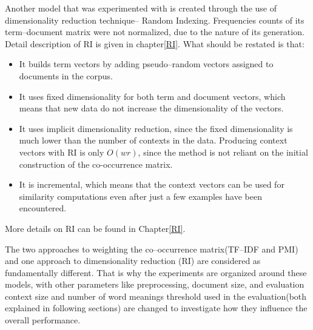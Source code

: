 Another model that was experimented with is created through the use of dimensionality reduction 
technique-- Random Indexing. Frequencies counts of its term--document matrix were not normalized, 
due to the nature of its generation. Detail description of RI is given in chapter\ref{RI}. What should be 
restated is that:
\begin{itemize}
\item It builds term vectors by adding pseudo--random vectors assigned to documents in the corpus.
\item It uses fixed dimensionality for both term and document vectors, which means that new data do not 
increase the dimensionality of the vectors.
\item It uses implicit dimensionality reduction, since the fixed dimensionality is
much lower than the number of contexts in the data. Producing
context vectors with RI is only $O(wr)$, since the method is not reliant on the
initial construction of the co-occurrence matrix.
\item It is incremental, which means that the context vectors can be used for similarity
computations even after just a few examples have been encountered.
\end{itemize}
More details on RI can be found in Chapter\ref{RI}. 

The two approaches to weighting the co--occurrence matrix(TF--IDF and PMI) and one approach to 
dimensionality reduction (RI) are considered as fundamentally different. That is why the experiments are organized around these models, with other 
parameters like preprocessing, document size, and evaluation context size and number of word 
meanings threshold used in the evaluation(both explained in following sections) are changed to investigate how they influence the overall performance. 

